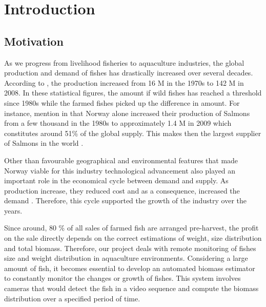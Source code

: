 \chapter{Introduction}
\label{chapter:Introduction}
 
\section{Motivation}
As we progress from livelihood fisheries to aquaculture industries, the global 
production and demand of fishes has drastically increased over several decades. 
According to \cite{Asche2011}, the production increased from 16 M in the 1970s to 
142 M in 2008. In these statistical figures, the amount if wild fishes has reached 
a threshold since 1980s while the farmed fishes picked up the difference in amount.
For instance, \citeauthor{LARSEN2011a} mention in \citeyearpar{LARSEN2011a} that Norway 
alone increased their production of Salmons from a few thousand in the 1980s to 
approximately 1.4 M in 2009 which constitutes around 51\% of the global supply. 
This makes then the largest supplier of Salmons in the world \citep{Asche2011, LARSEN2011a, Liu2011}.

Other than favourable geographical and environmental features that made Norway viable 
for this industry technological advancement also played an important role in the 
economical cycle between demand and supply. As production increase, they reduced 
cost and as a consequence, increased the demand \cite{Asche2011}. Therefore, this cycle 
supported the growth of the industry over the years.

Since around, 80 \% of all sales of farmed fish are arranged pre-harvest, the profit 
on the sale directly depends on the correct estimations of weight, size distribution 
and total biomass. Therefore, our project deals with remote monitoring of fishes size 
and weight distribution in aquaculture environments. Considering a large amount of fish, 
it becomes essential to develop an automated biomass estimator to constantly monitor 
the changes or growth of fishes. This system involves cameras that would detect the 
fish in a video sequence and compute the biomass distribution over a specified period 
of time.

